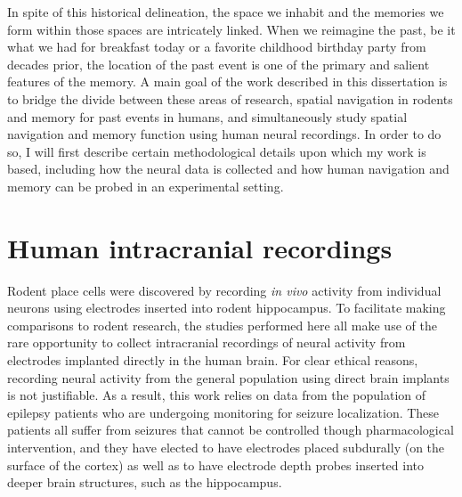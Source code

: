 In spite of this historical delineation, the space we inhabit and the memories we form within those spaces are intricately linked. When we reimagine the past, be it what we had for breakfast today or a favorite childhood birthday party from decades prior, the location of the past event is one of the primary and salient features of the memory. A main goal of the work described in this dissertation is to bridge the divide between these areas of research, spatial navigation in rodents and memory for past events in humans, and simultaneously study spatial navigation and memory function using human neural recordings. In order to do so, I will first describe certain methodological details upon which my work is based, including how the neural data is collected and how human navigation and memory can be probed in an experimental setting.









\section{Human intracranial recordings}

Rodent place cells were discovered by recording \textit{in vivo} activity from individual neurons using electrodes inserted into rodent hippocampus. To facilitate making comparisons to rodent research, the studies performed here all make use of the rare opportunity to collect intracranial recordings of neural activity from electrodes implanted directly in the human brain. For clear ethical reasons, recording neural activity from the general population using direct brain implants is not justifiable. As a result, this work relies on data from the population of epilepsy patients who are undergoing monitoring for seizure localization. These patients all suffer from seizures that cannot be controlled though pharmacological intervention, and they have elected to have electrodes placed subdurally (on the surface of the cortex) as well as to have electrode depth probes inserted into deeper brain structures, such as the hippocampus.

